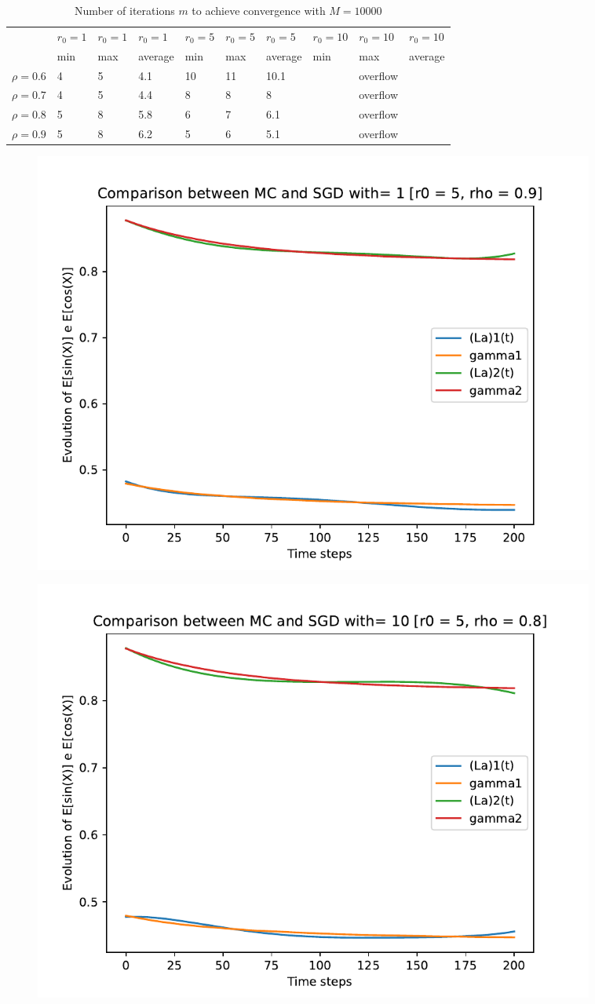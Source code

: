\documentclass[a4paper,11pt,openright]{report}
\begin{document}
\begin{table}[H]
\centering
\addtolength{\leftskip}{-1.5cm}
\addtolength{\rightskip}{-1.5cm}
\begin{tabular}{|c|lllllllll|}
\hline
$ $ & $r_0 = 1$ & $r_0 = 1$ & $r_0 = 1$ & $r_0 = 5$ & $r_0 = 5$ & $r_0 = 5$ & $r_0 = 10$ & $r_0 = 10$ & $r_0 = 10$  \\
$ $ & min & max & average & min & max & average & min & max & average \\ 
\hline
$\rho = 0.6$ & 4 & 5 & 4.1 & 10 & 11 & 10.1 &  & overflow &  \\

$\rho = 0.7$ & 4 & 5 & 4.4 & 8 & 8 & 8 &  & overflow &  \\

$\rho = 0.8$ & 5 & 8 & 5.8 & 6 & 7 & 6.1 &  & overflow & \\

$\rho = 0.9$ & 5 & 8 & 6.2 & 5 & 6 & 5.1 &  & overflow & \\
\hline
\end{tabular}
\caption{Number of iterations $m$ to achieve convergence with $M = 10000$}
\end{table}
\begin{figure}[H]
\centering
\includegraphics[width=0.9\textwidth]{images/graphics T = 2/n = 5, M = 1 sine and cosine.pdf}
\end{figure}
\begin{figure}[H]
\centering
\includegraphics[width=0.9\textwidth]{images/graphics T = 2/n = 5, M = 10 sine and cosine.pdf}
\end{figure}
\end{document}

